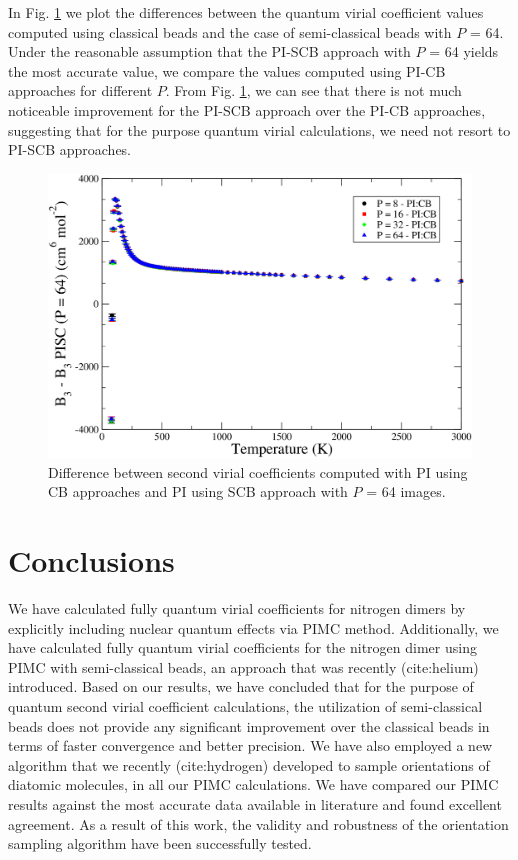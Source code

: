         In Fig. \ref{fig:B3AllDiffPICB} we plot the differences between the quantum virial coefficient values computed using classical beads and the case of semi-classical beads with $P$ = 64. Under the reasonable assumption that the PI-SCB approach with $P$ = 64 yields the most accurate value, we compare the values computed using PI-CB approaches for different $P$. From Fig. \ref{fig:B3AllDiffPICB}, we can see that there is not much noticeable improvement for the PI-SCB approach over the PI-CB approaches, suggesting that for the purpose quantum virial calculations, we need not resort to PI-SCB approaches.
        \begin{figure}[!htbp]
            \centering
            \includegraphics[scale=0.20,keepaspectratio]{Chapter-5/Figures/B3AllDiffPICB.png}
            \caption{Difference between second virial coefficients computed with PI using CB approaches and PI using SCB approach with $P$ = 64 images.}
            \label{fig:B3AllDiffPICB}
        \end{figure}
    
    \section{Conclusions}
    \label{sec:conclusion}
        We have calculated fully quantum virial coefficients for nitrogen dimers by explicitly including nuclear quantum effects via PIMC method. Additionally, we have calculated fully quantum virial coefficients for the nitrogen dimer using PIMC with semi-classical beads, an approach that was recently (cite:helium) introduced. Based on our results, we have concluded that for the purpose of quantum second virial coefficient calculations, the utilization of semi-classical beads does not provide any significant improvement over the classical beads in terms of faster convergence and better precision. We have also employed a new algorithm that we recently (cite:hydrogen) developed to sample orientations of diatomic molecules, in all our PIMC calculations. We have compared our PIMC results against the most accurate data available in literature and found excellent agreement. As a result of this work, the validity and robustness of the orientation sampling algorithm have been successfully tested.
